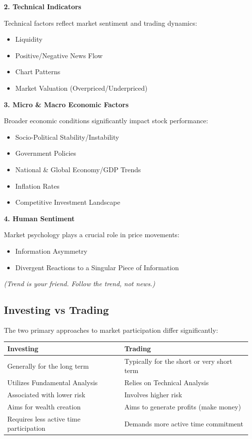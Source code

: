 \documentclass[12pt]{article}
\begin{document}
\textbf{2. Technical Indicators}

Technical factors reflect market sentiment and trading dynamics:
\begin{itemize}
\item Liquidity
\item Positive/Negative News Flow
\item Chart Patterns
\item Market Valuation (Overpriced/Underpriced)
\end{itemize}

\textbf{3. Micro \& Macro Economic Factors}

Broader economic conditions significantly impact stock performance:
\begin{itemize}
\item Socio-Political Stability/Instability
\item Government Policies
\item National \& Global Economy/GDP Trends
\item Inflation Rates
\item Competitive Investment Landscape
\end{itemize}

\textbf{4. Human Sentiment}

Market psychology plays a crucial role in price movements:
\begin{itemize}
\item Information Asymmetry
\item Divergent Reactions to a Singular Piece of Information
\end{itemize}

\begin{center}
\textit{(Trend is your friend. Follow the trend, not news.)}
\end{center}

\subsection{Investing vs Trading}

The two primary approaches to market participation differ significantly:

\begin{center}
\begin{tabular}{|>{\raggedright}p{6.5cm}|>{\raggedright\arraybackslash}p{6.5cm}|}
\hline
\textbf{Investing} & \textbf{Trading} \\
\hline
Generally for the long term & Typically for the short or very short term \\
\hline
Utilizes Fundamental Analysis & Relies on Technical Analysis \\
\hline
Associated with lower risk & Involves higher risk \\
\hline
Aims for wealth creation & Aims to generate profits (make money) \\
\hline
Requires less active time participation & Demands more active time commitment \\
\hline
\end{tabular}
\end{center}
\end{document}
